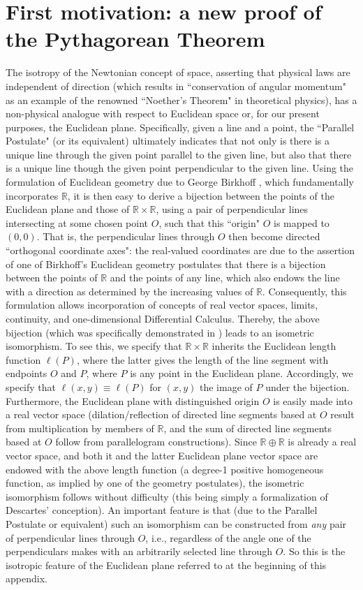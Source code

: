 \documentclass{amsart}
\numberwithin{equation}{section}
\theoremstyle{definition}
\numberwithin{theorem}{section}
\begin{document}
 \section{First motivation: a  new proof of the Pythagorean Theorem}    The isotropy of the Newtonian concept of space, asserting that physical laws are independent of direction (which results in ``conservation of angular momentum" as an example of the renowned ``Noether's Theorem" in theoretical physics), has a non-physical analogue with respect to Euclidean space or, for our present purposes, the Euclidean plane.  Specifically, given a line and a point, the ``Parallel Postulate" (or its equivalent) ultimately indicates that not only is there is a unique line through the given point parallel to the given line, but also that there is a unique line though the given point perpendicular to the given line.  Using the formulation of Euclidean geometry due to George Birkhoff \cite{birkhoff:1932}, which fundamentally incorporates $\mathbb{R}$, it is then easy to derive a bijection between the points of the Euclidean plane and those of $\mathbb{R}\times\mathbb{R}$, using a pair of perpendicular lines intersecting at some chosen point $O$, such that this ``origin" $O$ is mapped to $(0,0)$.  That is, the perpendicular lines through $O$ then become directed ``orthogonal coordinate axes": the real-valued coordinates are due to the assertion of one of Birkhoff's Euclidean geometry postulates that there is a bijection between the points of $\mathbb{R}$ and the points of any line, which also endows the line with a direction as determined by the increasing values of $\mathbb{R}$.  Consequently, this formulation allows incorporation of concepts of real vector spaces, limits, continuity, and one-dimensional Differential Calculus.  Thereby, the above bijection (which was specifically demonstrated in \cite{birkhoff:1932}) leads to an isometric isomorphism. 
To see this, we specify that $\mathbb{R}\times\mathbb{R}$  inherits the Euclidean length function $\ell(P)$, where the latter gives the length of the line segment with endpoints $O$ and $P$, where $P$ is  any point in the Euclidean plane.  Accordingly, we specify that $\ell(x,y) \equiv \ell(P)$ for $(x,y)$ the image of $P$ under the bijection.  Furthermore, the Euclidean plane with distinguished origin $O$ is easily made into a real vector space (dilation/reflection of directed line segments based at $O$ result from multiplication by members of $\mathbb{R}$, and the sum of directed line segments based at $O$ follow from parallelogram constructions).   Since $\mathbb{R}\oplus\mathbb{R}$ is already a real vector space, and both it and the latter Euclidean plane vector space are endowed with the above length function (a degree-1 positive homogeneous function, as implied by one of the geometry postulates), the isometric isomorphism follows without difficulty (this being simply a formalization of Descartes' conception).  An important feature is that (due to the Parallel Postulate or equivalent) such an isomorphism can be constructed from {\it any} pair of perpendicular lines through $O$, i.e., regardless of the angle one of the perpendiculars makes with an arbitrarily selected line through $O$.  So this is the isotropic feature of the Euclidean plane referred to at the beginning of this appendix.    
 
\end{document}
